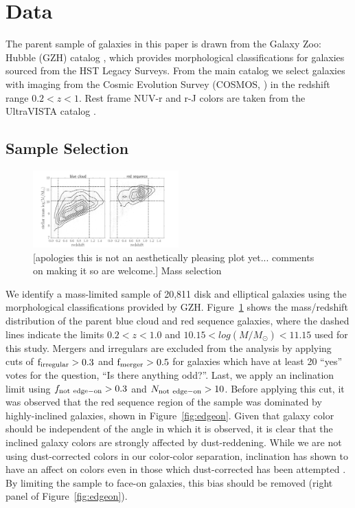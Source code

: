 \documentclass[useAMS,usenatbib]{mn2e}
\begin{document}
\section{Data}
\label{sec:Data}

The parent sample of galaxies in this paper is drawn from the Galaxy Zoo: Hubble (GZH) catalog \citep{Willett2016}, which provides morphological classifications for galaxies sourced from the HST Legacy Surveys. From the main catalog we select galaxies with imaging from the Cosmic Evolution Survey (COSMOS, \citet{Scoville2007}) in the redshift range $0.2<z<1$.  Rest frame NUV-r and r-J colors are taken from the UltraVISTA catalog \citep{McCracken2012,Ilbert2013}.

\subsection{Sample Selection}
\label{sec:sampleselection}

\begin{figure}
\centering
\includegraphics[width=0.5\textwidth]{figures/mass_selection.pdf}
\caption{[apologies this is not an aesthetically pleasing plot yet... comments on making it so are welcome.] Mass selection}
\label{masscut}
\end{figure}

We identify a mass-limited sample of 20,811 disk and elliptical galaxies using the morphological classifications provided by GZH. Figure~\ref{masscut} shows the mass/redshift distribution of the parent blue cloud and red sequence galaxies, where the dashed lines indicate the limits $0.2<z<1.0$ and $10.15<log(M/M_{\odot})<11.15$ used for this study. Mergers and irregulars are excluded from the analysis by applying cuts of $\rm f_{irregular} > 0.3$ and $\rm f_{merger} > 0.5$ for galaxies which have at least 20 ``yes'' votes for the question, ``Is there anything odd?''. Last, we apply an inclination limit using $f_{\rm not~edge-on} > 0.3$ and $N_{\rm not~edge-on}>10$. Before applying this cut, it was observed that the red sequence region of the sample was dominated by highly-inclined galaxies, shown in Figure~\ref{fig:edgeon}. Given that galaxy color should be independent of the angle in which it is observed, it is clear that the inclined galaxy colors are strongly affected by dust-reddening. While we are not using dust-corrected colors in our color-color separation, inclination has shown to have an affect on colors even in those which dust-corrected has been attempted \citep{Morselli2016a,Devour2017}. By limiting the sample to face-on galaxies, this bias should be removed (right panel of Figure~\ref{fig:edgeon}). 
 
\end{document}
